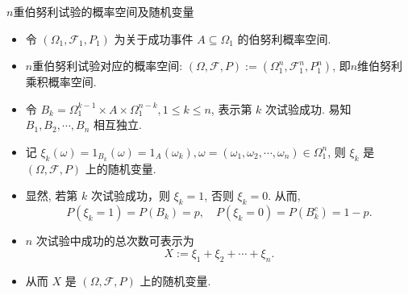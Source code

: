 \documentclass[Prob-All.tex]{subfiles}
\begin{document}
\begin{frame}{$n$重伯努利试验的概率空间及随机变量}
\begin{itemize}[<+-|alert@+>]
\item 令 $\left(\Omega_{1}, \mathscr{F}_{1}, P_{1}\right)$ 为关于成功事件 $A \subseteq \Omega_{1}$ 的伯努利概率空间.
\item $n$重伯努利试验对应的概率空间: $(\Omega, \mathscr{F}, P):=\left(\Omega_{1}^n, \mathscr{F}_{1}^n, P_{1}^n\right)$, 即$n$维伯努利乘积概率空间.
\item 令 $B_{k}=\Omega_{1}^{k-1} \times A \times \Omega_{1}^{n-k}, 1\leq k\leq n$, 表示第 $k$ 次试验成功. 易知 $B_{1}, B_{2}, \cdots, B_n$ 相互独立.
\item 记 $ \xi_{k}(\omega)=1_{B_{k}}(\omega)=1_{A}\left(\omega_{k}\right),  \omega=\left(\omega_{1}, \omega_{2}, \cdots, \omega_n\right) \in \Omega_{1}^n$,
则 $\xi_{k}$ 是 $(\Omega, \mathscr{F}, P)$ 上的随机变量.
\item 显然, 若第 $k$ 次试验成功，则 $\xi_{k}=1$, 否则 $\xi_{k}=0$. 从而,
$$P\left(\xi_{k}=1\right)=P\left(B_{k}\right)=p, \quad P\left(\xi_{k}=0\right)=P\left(B_{k}^{c}\right)=1-p.$$
\item $n$ 次试验中成功的总次数可表示为 $$X:=\xi_{1}+\xi_{2}+\cdots+\xi_{n}.$$
\item 从而 $X$ 是 $(\Omega, \mathscr{F}, P)$ 上的随机变量.
\end{itemize}

\end{frame}
\end{document}
